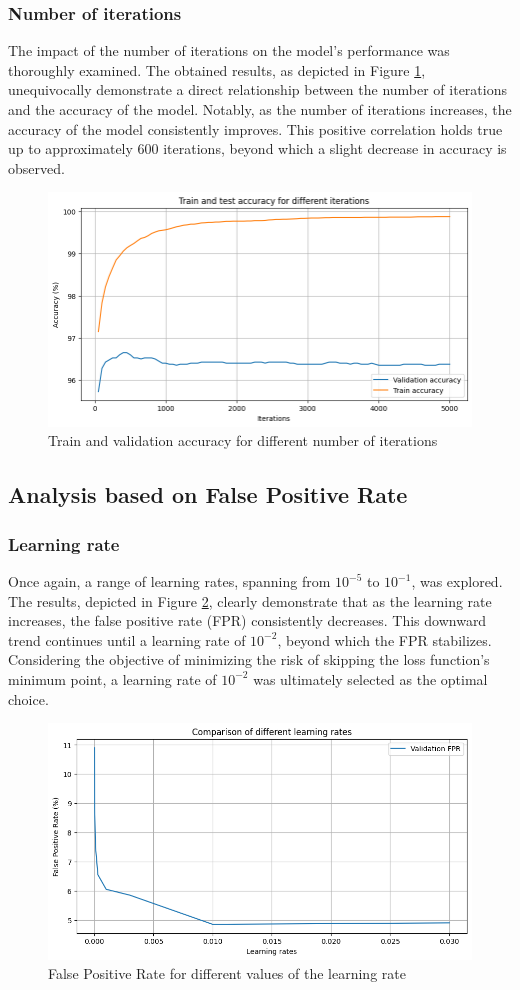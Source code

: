 \documentclass{class}
\begin{document}
\subsubsection*{Number of iterations}
The impact of the number of iterations on the model's performance was thoroughly examined.
The obtained results, as depicted in Figure \ref{fig-7}, unequivocally demonstrate a direct relationship between the number of iterations and
the accuracy of the model. Notably, as the number of iterations increases, the accuracy of the model consistently improves.
This positive correlation holds true up to approximately 600 iterations, beyond which a slight decrease in accuracy is observed.

\begin{figure}[h]
    \centering
    \includegraphics[width=0.7\columnwidth]{images/logreg_iter.png}
    \caption{Train and validation accuracy for different number of iterations}
    \label{fig-7}
\end{figure}

\subsection{Analysis based on False Positive Rate}
\subsubsection*{Learning rate}

Once again, a range of learning rates, spanning from $10^{-5}$ to $10^{-1}$, was explored.
The results, depicted in Figure \ref{fig-8}, clearly demonstrate that as the learning rate increases, the false positive rate (FPR) consistently decreases.
This downward trend continues until a learning rate of $10^{-2}$, beyond which the FPR stabilizes.
Considering the objective of minimizing the risk of skipping the loss function's minimum point, a learning
rate of $10^{-2}$ was ultimately selected as the optimal choice.
\begin{figure}[h]
    \centering
    \includegraphics[width=0.7\columnwidth]{images/fpr_logreg_lr.png}
    \caption{False Positive Rate for different values of the learning rate}
    \label{fig-8}
\end{figure}
\end{document}
